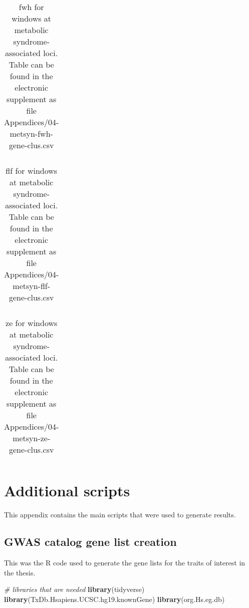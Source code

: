 \documentclass[twoside,openright]{report}
\newenvironment{Shaded}{\begin{snugshade}}{\end{snugshade}}
\newcommand{\KeywordTok}[1]{\textcolor[rgb]{0.13,0.29,0.53}{\textbf{#1}}}
\newcommand{\CommentTok}[1]{\textcolor[rgb]{0.56,0.35,0.01}{\textit{#1}}}
\newcommand{\NormalTok}[1]{#1}
\begin{document}
\begin{appendices}
\begin{table}[!htb]
\caption[\gls{fwh} for windows at metabolic syndrome-associated loci.]{\gls{fwh} for windows at metabolic syndrome-associated loci. Table can be found in the electronic supplement as file Appendices/04-metsyn-fwh-gene-clus.csv}
\centering
  \begin{tabular}{l l}
  \end{tabular}
  \label{tab:metsynfwhgeneclus}
\end{table}

\begin{table}[!htb]
\caption[\gls{flf} for windows at metabolic syndrome-associated loci.]{\gls{flf} for windows at metabolic syndrome-associated loci. Table can be found in the electronic supplement as file Appendices/04-metsyn-flf-gene-clus.csv}
\centering
  \begin{tabular}{l l}
  \end{tabular}
  \label{tab:metsynflfgeneclus}
\end{table}

\begin{table}[!htb]
\caption[\gls{ze} for windows at metabolic syndrome-associated loci.]{\gls{ze} for windows at metabolic syndrome-associated loci. Table can be found in the electronic supplement as file Appendices/04-metsyn-ze-gene-clus.csv}
\centering
  \begin{tabular}{l l}
  \end{tabular}
  \label{tab:metsynzegeneclus}
\end{table}

\chapter{Additional
scripts}\label{appendix-b---additional-scripts}

This appendix contains the main scripts that were used to generate
results.

\section{GWAS catalog gene list creation}\label{gwascatlist}

This was the R code used to generate the gene lists for the traits of
interest in the thesis.

\begin{Shaded}
\begin{Highlighting}[]
\CommentTok{# libraries that are needed}
\KeywordTok{library}\NormalTok{(tidyverse)}
\KeywordTok{library}\NormalTok{(TxDb.Hsapiens.UCSC.hg19.knownGene)}
\KeywordTok{library}\NormalTok{(org.Hs.eg.db)}


\end{Highlighting}
\end{Shaded}
\end{appendices}
\end{document}
